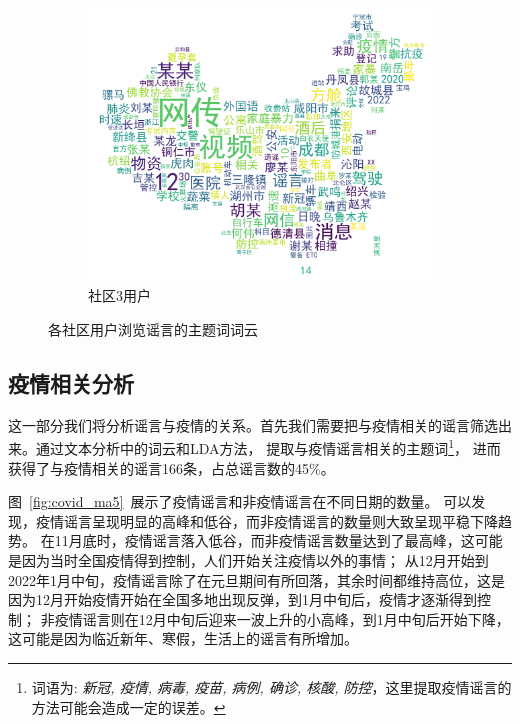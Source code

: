 \documentclass[UTF8]{ctexart}
\begin{document}
\begin{figure}[!ht]
     \hfill
     \begin{subfigure}[b]{0.3\textwidth}
         \centering
         \includegraphics[width=\textwidth]{../figures/wordcloud_user_3}
         \caption{社区3用户}
         \label{subfig:wordcloud_user_3}
     \end{subfigure}
    \caption{各社区用户浏览谣言的主题词词云}
    \label{fig:wordcloud_user}
\end{figure}

\subsection{疫情相关分析}

这一部分我们将分析谣言与疫情的关系。首先我们需要把与疫情相关的谣言筛选出来。通过文本分析中的词云和LDA方法，
提取与疫情谣言相关的主题词\footnote{词语为: \textit{新冠, 疫情, 病毒, 疫苗, 病例, 确诊, 核酸, 防控}，这里提取疫情谣言的方法可能会造成一定的误差。}，
进而获得了与疫情相关的谣言166条，占总谣言数的45\%。

图~\ref{fig:covid_ma5}~展示了疫情谣言和非疫情谣言在不同日期的数量。
可以发现，疫情谣言呈现明显的高峰和低谷，而非疫情谣言的数量则大致呈现平稳下降趋势。
在11月底时，疫情谣言落入低谷，而非疫情谣言数量达到了最高峰，这可能是因为当时全国疫情得到控制，人们开始关注疫情以外的事情；
从12月开始到2022年1月中旬，疫情谣言除了在元旦期间有所回落，其余时间都维持高位，这是因为12月开始疫情开始在全国多地出现反弹，到1月中旬后，疫情才逐渐得到控制；
非疫情谣言则在12月中旬后迎来一波上升的小高峰，到1月中旬后开始下降，这可能是因为临近新年、寒假，生活上的谣言有所增加。
\end{document}

